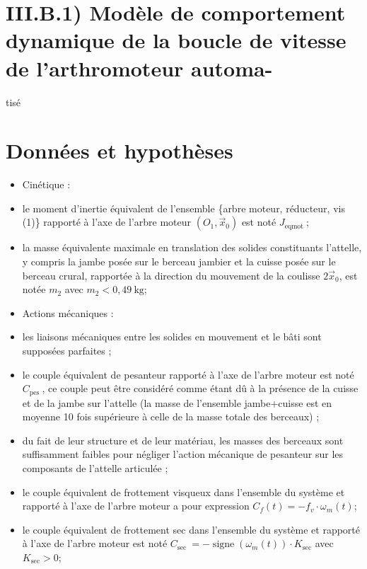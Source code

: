 \documentclass[10pt]{article}
\begin{document}
\section*{III.B.1) Modèle de comportement dynamique de la boucle de vitesse de l'arthromoteur automa-}
 tisé\section*{Données et hypothèses}
\begin{itemize}
  \item Cinétique :

  \item le moment d'inertie équivalent de l'ensemble \{arbre moteur, réducteur, vis (1)\} rapporté à l'axe de l'arbre moteur $\left(O_{1}, \vec{x}_{0}\right)$ est noté $J_{\text {eqmot }}$;

  \item la masse équivalente maximale en translation des solides constituants l'attelle, y compris la jambe posée sur le berceau jambier et la cuisse posée sur le berceau crural, rapportée à la direction du mouvement de la coulisse $2 \vec{x}_{0}$, est notée $m_{2}$ avec $m_{2}<0,49 \mathrm{~kg}$;

  \item Actions mécaniques :

  \item les liaisons mécaniques entre les solides en mouvement et le bâti sont supposées parfaites ;

  \item le couple équivalent de pesanteur rapporté à l'axe de l'arbre moteur est noté $C_{\text {pes }}$, ce couple peut être considéré comme étant dû à la présence de la cuisse et de la jambe sur l'attelle (la masse de l'ensemble jambe+cuisse est en moyenne 10 fois supérieure à celle de la masse totale des berceaux) ;

  \item du fait de leur structure et de leur matériau, les masses des berceaux sont suffisamment faibles pour négliger l'action mécanique de pesanteur sur les composants de l'attelle articulée ;

  \item le couple équivalent de frottement visqueux dans l'ensemble du système et rapporté à l'axe de l'arbre moteur a pour expression $C_{f}(t)=-f_{v} \cdot \omega_{m}(t)$;

  \item le couple équivalent de frottement sec dans l'ensemble du système et rapporté à l'axe de l'arbre moteur est noté $C_{\text {sec }}=-\operatorname{signe}\left(\omega_{m}(t)\right) \cdot K_{\mathrm{sec}}$ avec $K_{\mathrm{sec}}>0$;

\end{itemize}
\end{document}
